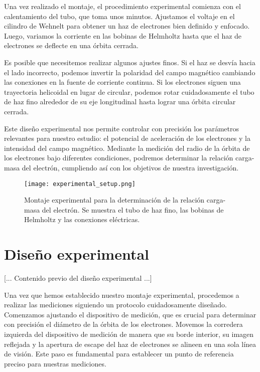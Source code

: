 \documentclass[twocolumn,a4paper,11pt]{scrartcl}
\begin{document}
Una vez realizado el montaje, el procedimiento experimental comienza con el calentamiento del tubo, que toma unos minutos. Ajustamos el voltaje en el cilindro de Wehnelt para obtener un haz de electrones bien definido y enfocado. Luego, variamos la corriente en las bobinas de Helmholtz hasta que el haz de electrones se deflecte en una órbita cerrada.

Es posible que necesitemos realizar algunos ajustes finos. Si el haz se desvía hacia el lado incorrecto, podemos invertir la polaridad del campo magnético cambiando las conexiones en la fuente de corriente continua. Si los electrones siguen una trayectoria helicoidal en lugar de circular, podemos rotar cuidadosamente el tubo de haz fino alrededor de su eje longitudinal hasta lograr una órbita circular cerrada.

Este diseño experimental nos permite controlar con precisión los parámetros relevantes para nuestro estudio: el potencial de aceleración de los electrones y la intensidad del campo magnético. Mediante la medición del radio de la órbita de los electrones bajo diferentes condiciones, podremos determinar la relación carga-masa del electrón, cumpliendo así con los objetivos de nuestra investigación.

\begin{figure}[h]
    \centering
    \texttt{[image: experimental\_setup.png]}
    \caption{Montaje experimental para la determinación de la relación carga-masa del electrón. Se muestra el tubo de haz fino, las bobinas de Helmholtz y las conexiones eléctricas.}
    \label{fig:experimental_setup}
\end{figure}

\section{Diseño experimental}

[... Contenido previo del diseño experimental ...]

Una vez que hemos establecido nuestro montaje experimental, procedemos a realizar las mediciones siguiendo un protocolo cuidadosamente diseñado. Comenzamos ajustando el dispositivo de medición, que es crucial para determinar con precisión el diámetro de la órbita de los electrones. Movemos la corredera izquierda del dispositivo de medición de manera que su borde interior, su imagen reflejada y la apertura de escape del haz de electrones se alineen en una sola línea de visión. Este paso es fundamental para establecer un punto de referencia preciso para nuestras mediciones.
\end{document}
